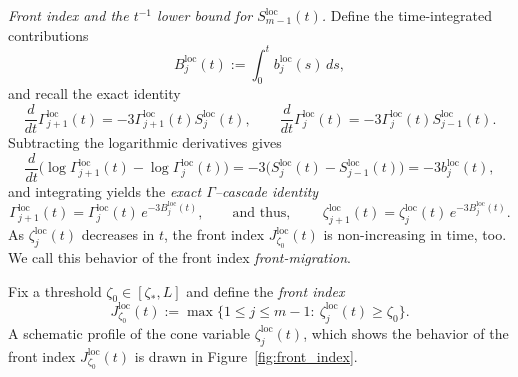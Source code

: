 \documentclass[reqno,11pt]{amsart}
\begin{document}
\noindent\emph{Front index and the \(t^{-1}\) lower bound for \(S_{m-1}^{\mathrm{loc}}(t)\).}
Define the time-integrated contributions
\[
    B_j^{\mathrm{loc}}(t):=\int_0^t b_j^{\mathrm{loc}}(s)\,ds,
\]
and recall the exact identity
\begin{equation*}
    \frac{d}{dt}\Gamma_{j+1}^{\mathrm{loc}}(t)=-3\Gamma_{j+1}^{\mathrm{loc}}(t)S_j^{\mathrm{loc}}(t),
    \qquad
    \frac{d}{dt}\Gamma_j^{\mathrm{loc}}(t)=-3\Gamma_j^{\mathrm{loc}}(t)S_{j-1}^{\mathrm{loc}}(t).
\end{equation*}
Subtracting the logarithmic derivatives gives
\[
    \frac{d}{dt}\Big(\log \Gamma_{j+1}^{\mathrm{loc}}(t)-\log \Gamma_j^{\mathrm{loc}}(t)\Big)
    =
    -3\big(S_j^{\mathrm{loc}}(t)-S_{j-1}^{\mathrm{loc}}(t)\big)
    =
    -3b_j^{\mathrm{loc}}(t),
\]
and integrating yields the \emph{exact $\Gamma$--cascade identity}
\begin{equation}
    \Gamma_{j+1}^{\mathrm{loc}}(t)=\Gamma_j^{\mathrm{loc}}(t)\,e^{-3B_j^{\mathrm{loc}}(t)},
    \qquad\text{and thus, }
    \qquad
    \label{eq:xi_cascade_intro}
    \zeta_{j+1}^{\mathrm{loc}}(t)=\zeta_j^{\mathrm{loc}}(t)\,e^{-3B_j^{\mathrm{loc}}(t)}.
\end{equation}
As $\zeta_j^{\mathrm{loc}}(t)$ decreases in $t$, the front index $J_{\zeta_0}^{\mathrm{loc}}(t)$ is non-increasing in time, too. We call this behavior of the  front index \emph{front-migration}.

Fix a threshold $\zeta_0\in[\zeta_\ast,L]$ and define the \emph{front index}
\[
    J_{\zeta_0}^{\mathrm{loc}}(t):=\max\Big\{1\le j\le m-1:\ \zeta_j^{\mathrm{loc}}(t)\ge \zeta_0\Big\}.
\]
A schematic profile of the cone variable $\zeta_j^{\mathrm{loc}}(t)$, which shows the behavior of the front index $J_{\zeta_0}^{\mathrm{loc}}(t)$ is drawn in Figure~\ref{fig:front_index}.
\end{document}
